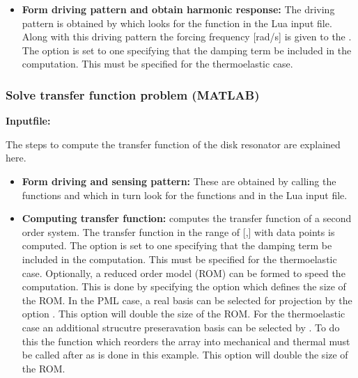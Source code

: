 \begin{itemize}

  \item{\textbf{Form driving pattern and obtain harmonic response:}}
  The driving pattern is obtained by 
  which looks for the function  in 
  the Lua input file. Along with this driving pattern the 
  forcing frequency [rad/s] is given to the 
  . The option  is set to one
  specifying that the damping term  be included in the 
  computation. This must be specified for the thermoelastic 
  case. 

\end{itemize}

\clearpage
\subsubsection*{Solve transfer function problem (MATLAB)}
\begin{flushleft}
  \textbf{Inputfile:}
  \\
\end{flushleft}
\hspace{1in}
{\footnotesize
{}
}

\clearpage
The steps to compute the transfer function of the disk
resonator are explained here. 

\begin{itemize}

  \item{\textbf{Form driving and sensing pattern:}}
  These are obtained by calling the functions
   and 
  which in turn look for the functions
   and 
  in the Lua input file.

  \item{\textbf{Computing transfer function:}}
   computes the transfer function
  of a second order system. The transfer function in the
  range of [,] with 
  data points is computed. The option  is set to one
  specifying that the damping term  be included in the 
  computation. This must be specified for the thermoelastic 
  case. Optionally, a reduced order model (ROM)
  can be formed to speed the computation. This is done by
  specifying the  option which defines the size
  of the ROM. In the PML case, a real basis
  can be selected for projection by the option .
  This option will double the size of the ROM. For the 
  thermoelastic case an additional strucutre preseravation
  basis can be selected by . To do this
  the function  which reorders the 
   array into mechanical and thermal must be called
  after  as is done in this example.
  This option will double the size of the ROM. 

\end{itemize}

